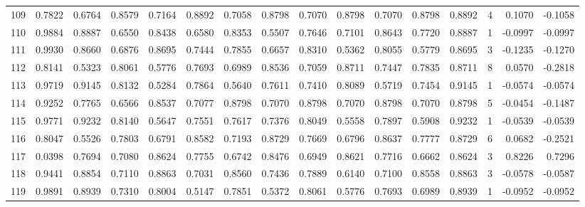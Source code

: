 \begin{tabular}{lrrrrrrrrrrrrrrr}
109 &      0.7822 &  0.6764 &  0.8579 &  0.7164 &  0.8892 &  0.7058 &  0.8798 &  0.7070 &  0.8798 &  0.7070 &   0.8798 &     0.8892 &      4 &                    0.1070 &                    -0.1058 \\
110 &      0.9884 &  0.8887 &  0.6550 &  0.8438 &  0.6580 &  0.8353 &  0.5507 &  0.7646 &  0.7101 &  0.8643 &   0.7720 &     0.8887 &      1 &                   -0.0997 &                    -0.0997 \\
111 &      0.9930 &  0.8660 &  0.6876 &  0.8695 &  0.7444 &  0.7855 &  0.6657 &  0.8310 &  0.5362 &  0.8055 &   0.5779 &     0.8695 &      3 &                   -0.1235 &                    -0.1270 \\
112 &      0.8141 &  0.5323 &  0.8061 &  0.5776 &  0.7693 &  0.6989 &  0.8536 &  0.7059 &  0.8711 &  0.7447 &   0.7835 &     0.8711 &      8 &                    0.0570 &                    -0.2818 \\
113 &      0.9719 &  0.9145 &  0.8132 &  0.5284 &  0.7864 &  0.5640 &  0.7611 &  0.7410 &  0.8089 &  0.5719 &   0.7454 &     0.9145 &      1 &                   -0.0574 &                    -0.0574 \\
114 &      0.9252 &  0.7765 &  0.6566 &  0.8537 &  0.7077 &  0.8798 &  0.7070 &  0.8798 &  0.7070 &  0.8798 &   0.7070 &     0.8798 &      5 &                   -0.0454 &                    -0.1487 \\
115 &      0.9771 &  0.9232 &  0.8140 &  0.5647 &  0.7551 &  0.7617 &  0.7376 &  0.8049 &  0.5558 &  0.7897 &   0.5908 &     0.9232 &      1 &                   -0.0539 &                    -0.0539 \\
116 &      0.8047 &  0.5526 &  0.7803 &  0.6791 &  0.8582 &  0.7193 &  0.8729 &  0.7669 &  0.6796 &  0.8637 &   0.7777 &     0.8729 &      6 &                    0.0682 &                    -0.2521 \\
117 &      0.0398 &  0.7694 &  0.7080 &  0.8624 &  0.7755 &  0.6742 &  0.8476 &  0.6949 &  0.8621 &  0.7716 &   0.6662 &     0.8624 &      3 &                    0.8226 &                     0.7296 \\
118 &      0.9441 &  0.8854 &  0.7110 &  0.8863 &  0.7031 &  0.8560 &  0.7436 &  0.7889 &  0.6140 &  0.7100 &   0.8558 &     0.8863 &      3 &                   -0.0578 &                    -0.0587 \\
119 &      0.9891 &  0.8939 &  0.7310 &  0.8004 &  0.5147 &  0.7851 &  0.5372 &  0.8061 &  0.5776 &  0.7693 &   0.6989 &     0.8939 &      1 &                   -0.0952 &                    -0.0952 \\

\end{tabular}
